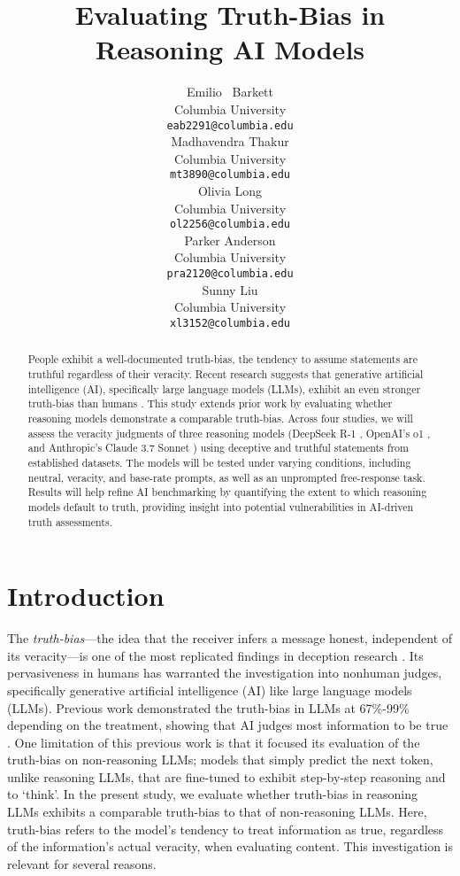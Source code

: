 \documentclass{article}
\title{Evaluating Truth-Bias in Reasoning AI Models}
\author{%
  Emilio ~Barkett\\
  Columbia University\\
  \texttt{eab2291@columbia.edu} \\
   \And
   Madhavendra Thakur \\
   Columbia University \\
   \texttt{mt3890@columbia.edu} \\
   \AND
   Olivia Long \\
   Columbia University \\
   \texttt{ol2256@columbia.edu} \\
   \And
   Parker Anderson \\
   Columbia University \\
   \texttt{pra2120@columbia.edu} \\
   \And
   Sunny Liu \\
   Columbia University \\
   \texttt{xl3152@columbia.edu} \\
}
\begin{document}
\maketitle


\begin{abstract}
  People exhibit a well-documented truth-bias, the tendency to assume statements are truthful regardless of their veracity. Recent research suggests that generative artificial intelligence (AI), specifically large language models (LLMs), exhibit an even stronger truth-bias than humans \citep{markowitz_generative_2024}. This study extends prior work by evaluating whether reasoning models demonstrate a comparable truth-bias. Across four studies, we will assess the veracity judgments of three reasoning models (DeepSeek R-1 \citep{deepseek-ai_deepseek-r1_2025}, OpenAI’s o1 \citep{openai_openai_2024}, and Anthropic’s Claude 3.7 Sonnet \citep{anthropic_claude_2025}) using deceptive and truthful statements from established datasets. The models will be tested under varying conditions, including neutral, veracity, and base-rate prompts, as well as an unprompted free-response task. Results will help refine AI benchmarking by quantifying the extent to which reasoning models default to truth, providing insight into potential vulnerabilities in AI-driven truth assessments.
\end{abstract}

\section{Introduction}

The \textit{truth-bias}---the idea that the receiver infers a message honest, independent of its veracity---is one of the most replicated findings in deception research \citep{levine_duped_2020, levine_truth-default_2014}. Its pervasiveness in humans has warranted the investigation into nonhuman judges, specifically generative artificial intelligence (AI) like large language models (LLMs). Previous work demonstrated the truth-bias in LLMs at 67\%-99\% depending on the treatment, showing that AI judges most information to be true \citep{markowitz_generative_2024}. One limitation of this previous work is that it focused its evaluation of the truth-bias on non-reasoning LLMs; models that simply predict the next token, unlike reasoning LLMs, that are fine-tuned to exhibit step-by-step reasoning and to `think'. In the present study, we evaluate whether truth-bias in reasoning LLMs exhibits a comparable truth-bias to that of non-reasoning LLMs. Here, truth-bias refers to the model's tendency to treat information as true, regardless of the information's actual veracity, when evaluating content. This investigation is relevant for several reasons.
\end{document}
